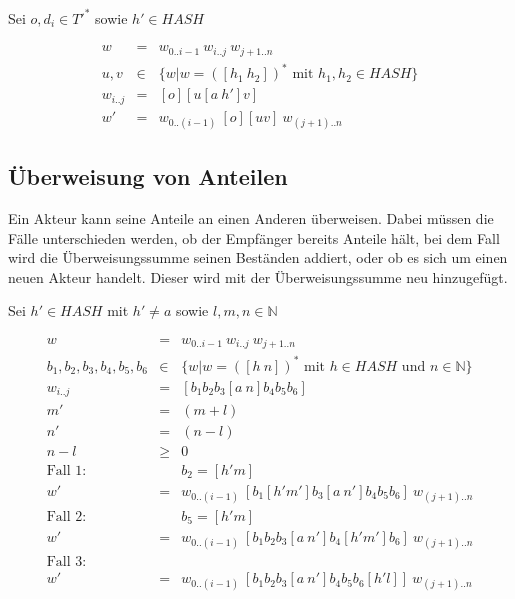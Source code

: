 \documentclass[a4paper,12pt]{report}
\begin{document}
Sei $o,d_i \in T'^*$ sowie $h'\in HASH$

\begin{eqnarray}
  w &=& w_{0 .. i-1}\ w_{i..j}\ w_{j+1 .. n} \\
  u,v &\in& \{ w | w = ([h_1\ h_2])^*\text{ mit } h_1,h_2 \in HASH \} \\
  w_{i..j} &=& [o][u[a\ h']v] \\
  w' &=& w_{0 .. (i-1)}\ [o][uv]\ w_{(j+1) .. n}
\end{eqnarray}

\subsection{Überweisung von Anteilen}
\label{manipulationanteile}

Ein Akteur kann seine Anteile an einen Anderen überweisen. Dabei müssen die Fälle unterschieden werden, ob der Empfänger bereits Anteile hält, bei dem Fall wird die Überweisungssumme seinen Beständen addiert, oder ob es sich um einen neuen Akteur handelt. Dieser wird mit der Überweisungssumme neu hinzugefügt. 

Sei $h'\in HASH$ mit $h' \neq a$ sowie $l,m,n\in\mathbb{N}$

\begin{eqnarray}
  w &=& w_{0 .. i-1}\ w_{i..j}\ w_{j+1 .. n} \\
  b_1, b_2, b_3, b_4, b_5, b_6 &\in& \{ w | w = ([h\ n])^*\text{ mit } h \in HASH\text{ und }n\in\mathbb{N} \} \\
  w_{i..j} &=& [ b_1 b_2 b_3 [a\ n] b_4 b_5 b_6 ] \\
  m' &=& (m+l) \\
  n' &=& (n-l) \\
  n - l &\geq& 0\\
  \text{Fall 1: } &&b_2 = [h' m]\\
  w' &=& w_{0 .. (i-1)}\ [ b_1 [h' m'] b_3 [a\ n'] b_4 b_5 b_6 ]\ w_{(j+1) .. n} \\
  \text{Fall 2: } &&b_5 = [h' m]\\
  w' &=& w_{0 .. (i-1)}\ [ b_1 b_2 b_3 [a\ n'] b_4 [h' m'] b_6 ]\ w_{(j+1) .. n}\\
  \text{Fall 3: } && \\
  w' &=& w_{0 .. (i-1)}\ [ b_1 b_2 b_3 [a\ n'] b_4 b_5 b_6 [h' l]]\ w_{(j+1) .. n}
\end{eqnarray}
\end{document}

